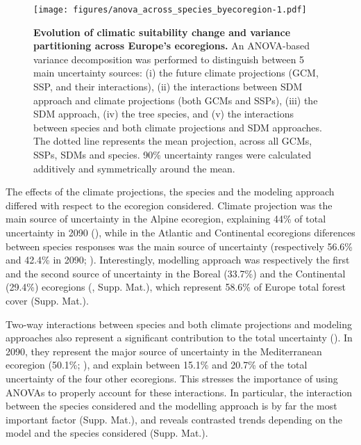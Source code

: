 \documentclass[letterpaper,8pt]{article}  %
\begin{document}
\begin{doublespacing}
\begin{linenumbers}
\begin{figure}[H]
\vspace*{0cm}
\centering
\texttt{[image: figures/anova\_across\_species\_byecoregion-1.pdf]}
\caption{\textbf{Evolution of climatic suitability change and variance partitioning across Europe's ecoregions.} An ANOVA-based variance decomposition was performed to distinguish between 5 main uncertainty sources: (i) the future climate projections (GCM, SSP, and their interactions), (ii) the interactions between SDM approach and climate projections (both GCMs and SSPs), (iii) the SDM approach, (iv) the tree species, and (v) the interactions between species and both climate projections and SDM approaches. The dotted line represents the mean projection, across all GCMs, SSPs, SDMs and species. 90\% uncertainty ranges were calculated additively and symmetrically around the mean.}
\label{fig:anovaecoregions}
\vspace*{0cm}
\end{figure}

The effects of the climate projections, the species  and the modeling approach differed with respect to the ecoregion considered. Climate projection was the main source of uncertainty in the Alpine ecoregion, explaining 44\% of total uncertainty in 2090 (), while in the Atlantic and Continental ecoregions diferences between species responses was the main source of uncertainty (respectively 56.6\% and 42.4\% in 2090; ). Interestingly, modelling approach was respectively the first and the second source of uncertainty in the Boreal (33.7\%) and the Continental (29.4\%) ecoregions (, Supp. Mat.), which represent 58.6\% of Europe total forest cover (Supp. Mat.).

Two-way interactions between species and both climate projections and modeling approaches also represent a significant contribution to the total uncertainty (). In 2090, they represent the major source of uncertainty in the Mediterranean ecoregion  (50.1\%; ), and explain between 15.1\% and 20.7\% of the total uncertainty of the four other ecoregions. This stresses the importance of using ANOVAs to properly account for these interactions. In particular, the interaction between the species considered and the modelling approach is by far the most important factor (Supp. Mat.), and reveals contrasted trends depending on the model and the species considered (Supp. Mat.). 


\end{linenumbers}
\end{doublespacing}
\end{document}
